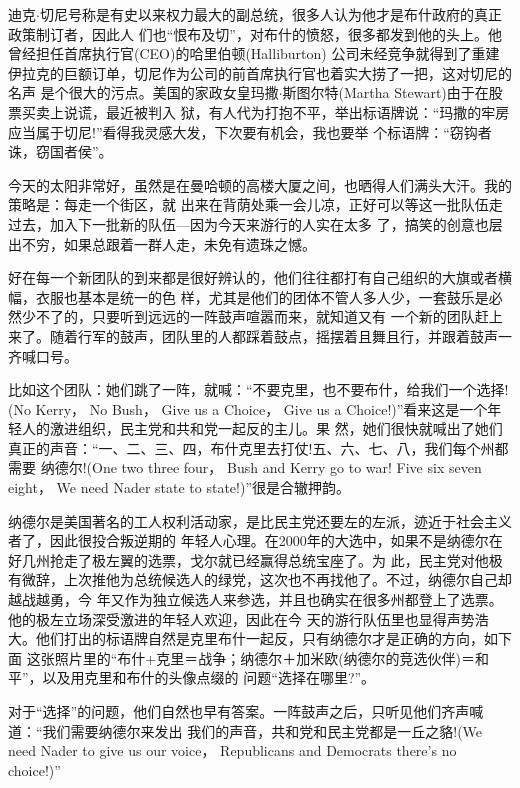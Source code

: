 ﻿\documentclass[11pt]{article}
\begin{document}
迪克$\cdot$切尼号称是有史以来权力最大的副总统，很多人认为他才是布什政府的真正政策制订者，因此人
们也``恨布及切''，对布什的愤怒，很多都发到他的头上。他曾经担任首席执行官(CEO)的哈里伯顿(Halliburton)
公司未经竞争就得到了重建伊拉克的巨额订单，切尼作为公司的前首席执行官也着实大捞了一把，这对切尼的名声
是个很大的污点。美国的家政女皇玛撒$\cdot$斯图尔特(Martha Stewart)由于在股票买卖上说谎，最近被判入
狱，有人代为打抱不平，举出标语牌说：``玛撒的牢房应当属于切尼!''看得我灵感大发，下次要有机会，我也要举
个标语牌：``窃钩者诛，窃国者侯''。

今天的太阳非常好，虽然是在曼哈顿的高楼大厦之间，也晒得人们满头大汗。我的策略是：每走一个街区，就
出来在背荫处乘一会儿凉，正好可以等这一批队伍走过去，加入下一批新的队伍---因为今天来游行的人实在太多
了，搞笑的创意也层出不穷，如果总跟着一群人走，未免有遗珠之憾。

好在每一个新团队的到来都是很好辨认的，他们往往都打有自己组织的大旗或者横幅，衣服也基本是统一的色
样，尤其是他们的团体不管人多人少，一套鼓乐是必然少不了的，只要听到远远的一阵鼓声喧嚣而来，就知道又有
一个新的团队赶上来了。随着行军的鼓声，团队里的人都踩着鼓点，摇摆着且舞且行，并跟着鼓声一齐喊口号。

比如这个团队：她们跳了一阵，就喊：``不要克里，也不要布什，给我们一个选择!(No Kerry， No Bush，
Give us a Choice， Give us a Choice!)''看来这是一个年轻人的激进组织，民主党和共和党一起反的主儿。果
然，她们很快就喊出了她们真正的声音：``一、二、三、四，布什克里去打仗!五、六、七、八，我们每个州都需要
纳德尔!(One two three four， Bush and Kerry go to war! Five six seven eight， We need Nader state to
state!)''很是合辙押韵。

纳德尔是美国著名的工人权利活动家，是比民主党还要左的左派，迹近于社会主义者了，因此很投合叛逆期的
年轻人心理。在2000年的大选中，如果不是纳德尔在好几州抢走了极左翼的选票，戈尔就已经赢得总统宝座了。为
此，民主党对他极有微辞，上次推他为总统候选人的绿党，这次也不再找他了。不过，纳德尔自己却越战越勇，今
年又作为独立候选人来参选，并且也确实在很多州都登上了选票。他的极左立场深受激进的年轻人欢迎，因此在今
天的游行队伍里也显得声势浩大。他们打出的标语牌自然是克里布什一起反，只有纳德尔才是正确的方向，如下面
这张照片里的``布什+克里＝战争；纳德尔＋加米欧(纳德尔的竞选伙伴)＝和平''，以及用克里和布什的头像点缀的
问题``选择在哪里?''。

对于``选择''的问题，他们自然也早有答案。一阵鼓声之后，只听见他们齐声喊道：``我们需要纳德尔来发出
我们的声音，共和党和民主党都是一丘之貉!(We need Nader to give us our voice， Republicans and
Democrats there's no choice!)''
\end{document}
